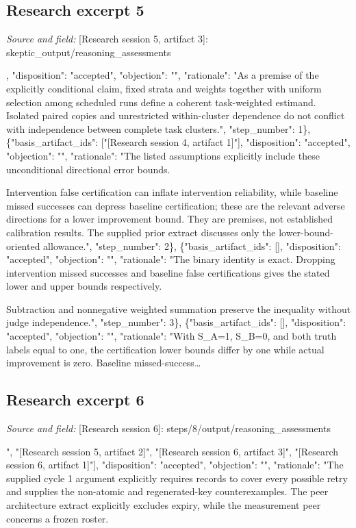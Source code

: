 \documentclass[11pt]{article}
\begin{document}
\subsection{Research excerpt 5}
\textit{Source and field: }[Research session 5, artifact 3]: skeptic\_output/reasoning\_assessments\par
[\{"basis\_artifact\_ids": [], "disposition": "accepted", "objection": "", "rationale": "As a premise of the explicitly conditional claim, fixed strata and weights together with uniform selection among scheduled runs define a coherent task-weighted estimand. Isolated paired copies and unrestricted within-cluster dependence do not conflict with independence between complete task clusters.", "step\_number": 1\}, \{"basis\_artifact\_ids": ["[Research session 4, artifact 1]"], "disposition": "accepted", "objection": "", "rationale": "The listed assumptions explicitly include these unconditional directional error bounds.

Intervention false certification can inflate intervention reliability, while baseline missed successes can depress baseline certification; these are the relevant adverse directions for a lower improvement bound. They are premises, not established calibration results. The supplied prior extract discusses only the lower-bound-oriented allowance.", "step\_number": 2\}, \{"basis\_artifact\_ids": [], "disposition": "accepted", "objection": "", "rationale": "The binary identity is exact. Dropping intervention missed successes and baseline false certifications gives the stated lower and upper bounds respectively.

Subtraction and nonnegative weighted summation preserve the inequality without judge independence.", "step\_number": 3\}, \{"basis\_artifact\_ids": [], "disposition": "accepted", "objection": "", "rationale": "With S\_A=1, S\_B=0, and both truth labels equal to one, the certification lower bounds differ by one while actual improvement is zero. Baseline missed-success\ldots{}

\subsection{Research excerpt 6}
\textit{Source and field: }[Research session 6]: steps/8/output/reasoning\_assessments\par
[\{"basis\_artifact\_ids": ["[Research session 6, artifact 2]", "[Research session 5, artifact 2]", "[Research session 6, artifact 3]", "[Research session 6, artifact 1]"], "disposition": "accepted", "objection": "", "rationale": "The supplied cycle 1 argument explicitly requires records to cover every possible retry and supplies the non-atomic and regenerated-key counterexamples. The peer architecture extract explicitly excludes expiry, while the measurement peer concerns a frozen roster.
\end{document}
